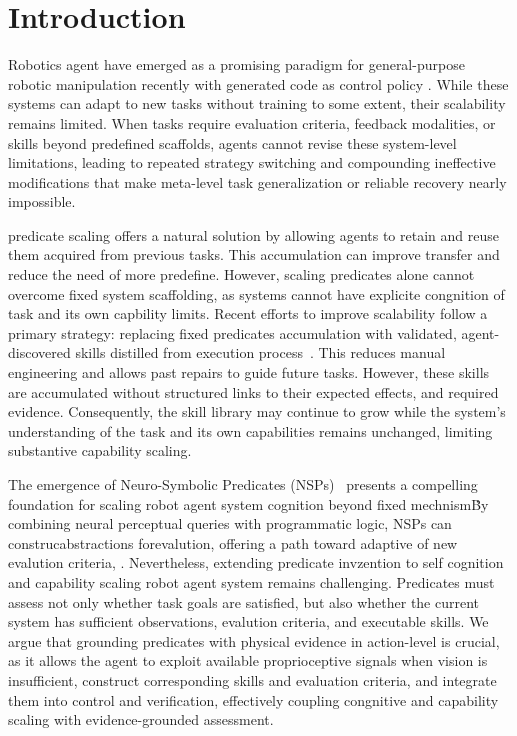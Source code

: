 \documentclass{article} %
\begin{document}
\section{Introduction}
 Robotics agent have emerged as a promising paradigm for general-purpose robotic manipulation recently with generated code as control policy \cite{kumar2026act,xiao2026enpire}. While  these systems can adapt to new tasks without training to some extent, their scalability remains limited. When tasks require evaluation criteria, feedback modalities, or skills beyond predefined scaffolds, agents cannot revise these system-level limitations, leading to repeated strategy switching and compounding ineffective modifications that make meta-level task generalization or reliable recovery nearly impossible.

predicate scaling offers a natural solution by allowing agents to retain and reuse them acquired from previous tasks. This accumulation can improve transfer and reduce the need of more predefine. However, scaling predicates alone cannot overcome fixed system scaffolding, as systems cannot have explicite congnition of task and its own capbility limits. Recent efforts to improve scalability follow a primary strategy: replacing fixed predicates accumulation with validated, agent-discovered skills distilled from execution process~\cite{zhang2026playful,lu2026aspire}. This reduces manual engineering and allows past repairs to guide future tasks. However, these skills are accumulated without structured links to their  expected effects, and required evidence. Consequently, the skill library may continue to grow while the system’s understanding of the task and its own capabilities remains unchanged, limiting substantive capability scaling.

The emergence of Neuro-Symbolic Predicates (NSPs)~\cite{liang2025visualpredicator} presents a compelling foundation for scaling robot  agent system cognition beyond fixed mechnism\. By combining neural perceptual queries with programmatic logic, NSPs can construcabstractions forevalution, offering a path toward adaptive of new evalution criteria, . Nevertheless, extending predicate invzention to self cognition and capability scaling robot agent system remains challenging. Predicates must assess not only whether task goals are satisfied, but also whether the current system has sufficient observations, evalution criteria, and executable skills. We argue that grounding predicates with physical evidence in action-level is crucial, as it allows the agent to exploit available proprioceptive signals when vision is insufficient, construct corresponding skills and evaluation criteria, and integrate them into control and verification, effectively coupling congnitive and capability scaling with evidence-grounded assessment.
\end{document}
